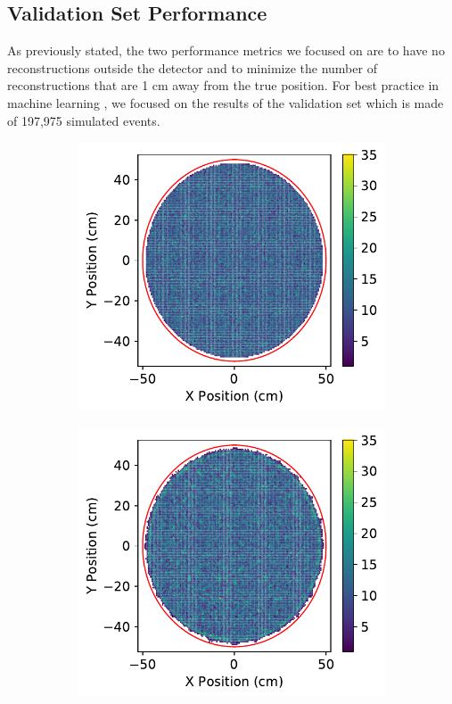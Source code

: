 \documentclass[../thesis.tex]{subfiles}
\begin{document}
\subsection{Validation Set Performance}\label{subsec:Valid}
As previously stated, the two performance metrics we focused on are to have no reconstructions outside the detector and to minimize the number of reconstructions that are 1 cm away from the true position.
For best practice in machine learning \cite{Overfit-Bad}, we focused on the results of the validation set which is made of 197,975 simulated events.
\begin{figure}[t]
	\centering
	\begin{subfigure}[b]{0.45\textwidth}
		\centering
		\includegraphics[width=\textwidth]{figures/optsim_val_true_pos.pdf}
	\end{subfigure}
	\hfill
	\begin{subfigure}[b]{0.45\textwidth}
		\centering
		\includegraphics[width=\textwidth]{figures/optsim_val_reco_pos.pdf}

\end{subfigure}
\end{figure}
\end{document}
